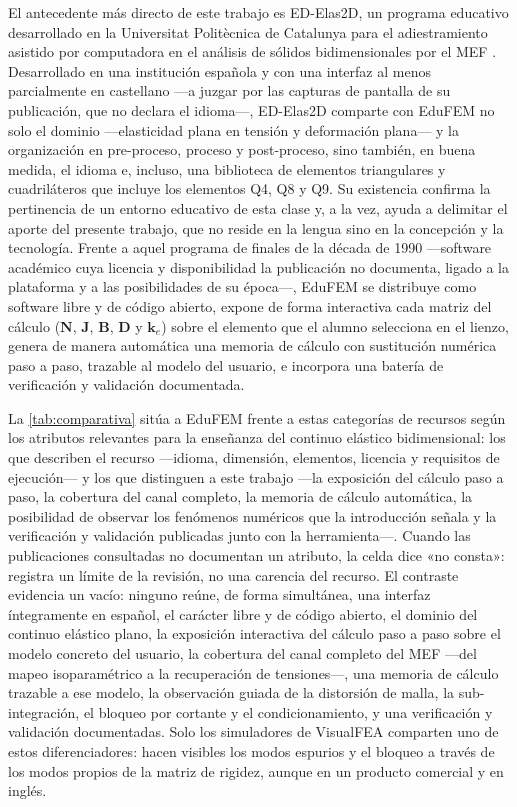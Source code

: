 El antecedente más directo de este trabajo es ED-Elas2D, un programa educativo desarrollado en la Universitat Politècnica de Catalunya para el adiestramiento asistido por computadora en el análisis de sólidos bidimensionales por el MEF \autocite{suarez1998edelas2d}. Desarrollado en una institución española y con una interfaz al menos parcialmente en castellano —a juzgar por las capturas de pantalla de su publicación, que no declara el idioma—, ED-Elas2D comparte con EduFEM no solo el dominio —elasticidad plana en tensión y deformación plana— y la organización en pre-proceso, proceso y post-proceso, sino también, en buena medida, el idioma e, incluso, una biblioteca de elementos triangulares y cuadriláteros que incluye los elementos Q4, Q8 y Q9. Su existencia confirma la pertinencia de un entorno educativo de esta clase y, a la vez, ayuda a delimitar el aporte del presente trabajo, que no reside en la lengua sino en la concepción y la tecnología. Frente a aquel programa de finales de la década de 1990 —software académico cuya licencia y disponibilidad la publicación no documenta, ligado a la plataforma y a las posibilidades de su época—, EduFEM se distribuye como software libre y de código abierto, expone de forma interactiva cada matriz del cálculo ($\bm{N}$, $\bm{J}$, $\bm{B}$, $\bm{D}$ y $\bm{k}_e$) sobre el elemento que el alumno selecciona en el lienzo, genera de manera automática una memoria de cálculo con sustitución numérica paso a paso, trazable al modelo del usuario, e incorpora una batería de verificación y validación documentada.

La \autoref{tab:comparativa} sitúa a EduFEM frente a estas categorías de recursos según los atributos relevantes para la enseñanza del continuo elástico bidimensional: los que describen el recurso —idioma, dimensión, elementos, licencia y requisitos de ejecución— y los que distinguen a este trabajo —la exposición del cálculo paso a paso, la cobertura del canal completo, la memoria de cálculo automática, la posibilidad de observar los fenómenos numéricos que la introducción señala y la verificación y validación publicadas junto con la herramienta—. Cuando las publicaciones consultadas no documentan un atributo, la celda dice «no consta»: registra un límite de la revisión, no una carencia del recurso. El contraste evidencia un vacío: ninguno reúne, de forma simultánea, una interfaz íntegramente en español, el carácter libre y de código abierto, el dominio del continuo elástico plano, la exposición interactiva del cálculo paso a paso sobre el modelo concreto del usuario, la cobertura del canal completo del MEF —del mapeo isoparamétrico a la recuperación de tensiones—, una memoria de cálculo trazable a ese modelo, la observación guiada de la distorsión de malla, la sub-integración, el bloqueo por cortante y el condicionamiento, y una verificación y validación documentadas. Solo los simuladores de VisualFEA comparten uno de estos diferenciadores: hacen visibles los modos espurios y el bloqueo a través de los modos propios de la matriz de rigidez, aunque en un producto comercial y en inglés.

